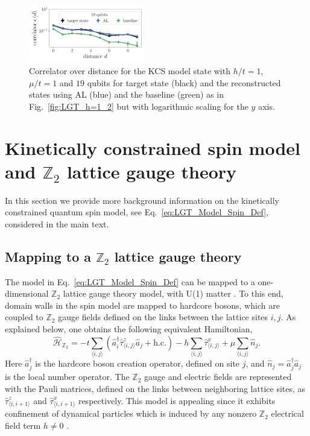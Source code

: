 \documentclass[pra,aps,showpacs,groupedaddress,superscriptaddress,twocolumn,toc=flat,biblatex,footinbib]{revtex4-1}
\renewcommand{\l}{\left(}
\renewcommand{\r}{\right)}
\renewcommand{\H}{\hat{\mathcal{H}}}
\renewcommand{\a}{\hat{a}}
\newcommand{\ad}{\hat{a}^\dagger}
\newcommand{\hc}{\text{h.c.}}
\newcommand{\Zt}{$\mathbb{Z}_2$ }
\begin{document}
\begin{figure}[t]
	\centering
   \includegraphics[width=0.45\textwidth]{Fig18.pdf}
	\caption[]{Correlator over distance for the KCS model state with $h/t=1$, $\mu/t=1$ and $19$ qubits for target state (black) and the reconstructed states using AL (blue) and the baseline (green) as in Fig.~\ref{fig:LGT_h=1_2} but with logarithmic scaling for the $y$ axis.}
	\label{fig:LGT_h=1_21}
\end{figure}



\section{Kinetically constrained spin model and $\mathbb{Z}_2$ lattice gauge theory}
\label{ApdxKinConsSpn}
In this section we provide more background information on the kinetically constrained quantum spin model, see Eq.~\eqref{eq:LGT_Model_Spin_Def}, considered in the main text.

\subsection{Mapping to a $\mathbb{Z}_2$ lattice gauge theory}
The model in Eq.~\eqref{eq:LGT_Model_Spin_Def} can be mapped to a one-dimensional \Zt lattice gauge theory model, with U(1) matter \cite{Borla2020,Kebric2021}. To this end, domain walls in the spin model are mapped to hardcore bosons, which are coupled to \Zt gauge fields defined on the links between the lattice sites $i,j$. As explained below, one obtains the following equivalent Hamiltonian,
\begin{equation}
    \H_{\mathbb{Z}_2} = -t \sum_{\langle i, j \rangle} \l \ad_i \hat{\tau}^{z}_{\langle i, j \rangle} \a_j + \hc \r
    - h \sum_{\langle i, j \rangle}
    \hat{\tau}^{x}_{\langle i, j \rangle}
    + \mu \sum_{\langle i, j \rangle} \hat{n}_j.
    \label{eq:LGT_Model_Original_Def}
\end{equation}
Here $\ad_j$ is the hardcore boson creation operator, defined on site $j$, and $\hat{n}_j = \ad_j \a_j$ is the local number operator. The \Zt gauge and electric fields are represented with the Pauli matrices, defined on the links between neighboring lattice sites, as $\hat{\tau}^{z}_{\langle i, i+1 \rangle}$ and $\hat{\tau}^{x}_{\langle i, i+1 \rangle}$ respectively. This model is appealing since it exhibits confinement of dynamical particles which is induced by any nonzero \Zt electrical field term $h \neq 0$ \cite{Borla2020,Kebric2021}.
\end{document}
